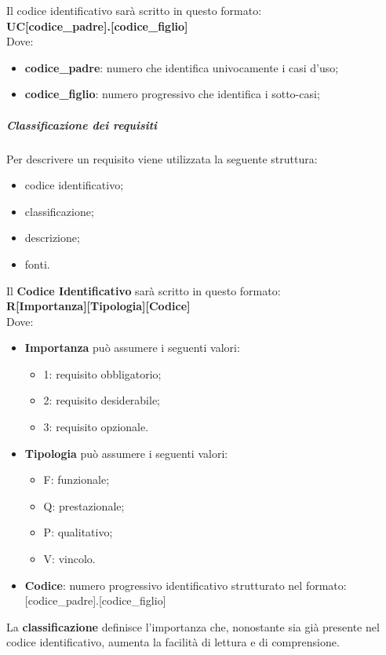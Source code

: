 		Il codice identificativo sarà scritto in questo formato: \\
		\textbf{UC[codice\_padre].[codice\_figlio]} \\
		Dove:
		\begin{itemize}
			\item \textbf{codice\_padre}: numero che identifica univocamente i casi d'uso\glo;
			\item \textbf{codice\_figlio}: numero progressivo che identifica i sotto-casi;
		\end{itemize}
		\subparagraph*{Classificazione dei requisiti}
		Per descrivere un requisito viene utilizzata la seguente struttura:
		\begin{itemize}
			\item codice identificativo;
			\item classificazione;
			\item descrizione;
			\item fonti.
		\end{itemize} 
		Il \textbf{Codice Identificativo} sarà scritto in questo formato: \\
		\textbf{R[Importanza][Tipologia][Codice]} \\
		Dove:
		\begin{itemize}
			\item \textbf{Importanza} può assumere i seguenti valori:
			\begin{itemize}
				\item 1: requisito obbligatorio;
				\item 2: requisito desiderabile;
				\item 3: requisito opzionale.
			\end{itemize}
			\item \textbf{Tipologia} può assumere i seguenti valori:
			\begin{itemize}
				\item F: funzionale;
				\item Q: prestazionale;
				\item P: qualitativo;
				\item V: vincolo.
			\end{itemize}
			\item\textbf{Codice}: numero progressivo identificativo strutturato nel formato: [codice\_padre].[codice\_figlio]
		\end{itemize}
		La \textbf{classificazione} definisce l'importanza che, nonostante sia già presente nel codice identificativo, aumenta la facilità di lettura e di comprensione.
